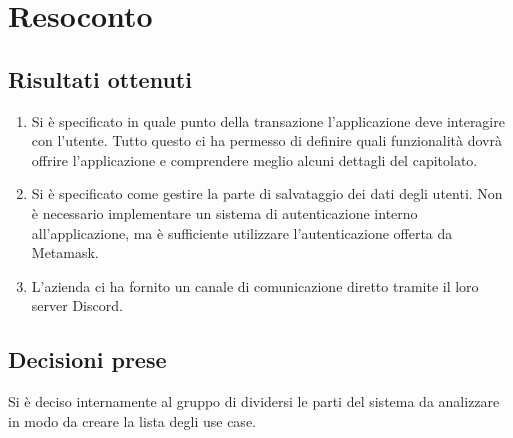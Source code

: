 \section{Resoconto}

\subsection{Risultati ottenuti}
\begin{enumerate}
    \item Si è specificato in quale punto della transazione l'applicazione deve interagire con l'utente. Tutto questo ci ha permesso di definire quali funzionalità dovrà offrire l'applicazione e comprendere meglio alcuni dettagli del capitolato.
    \item Si è specificato come gestire la parte di salvataggio dei dati degli utenti. Non è necessario implementare un sistema di autenticazione interno all'applicazione, ma è sufficiente utilizzare l'autenticazione offerta da Metamask.
    \item L'azienda ci ha fornito un canale di comunicazione diretto tramite il loro server Discord.
\end{enumerate}

\subsection{Decisioni prese}
Si è deciso internamente al gruppo di dividersi le parti del sistema da analizzare in modo da creare la lista degli use case.